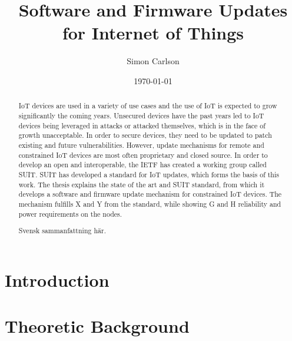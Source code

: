 \documentclass{kththesis}
\title{Software and Firmware Updates for Internet of Things}
\author{Simon Carlson}
\date{\today}
\begin{document}
\frontmatter

\titlepage

\begin{abstract}
IoT devices are used in a variety of use cases and the use of IoT is expected to grow
significantly the coming years. Unsecured devices have the past years led to IoT devices
being leveraged in attacks or attacked themselves, which is in the face of growth
unacceptable. In order to secure devices, they need to be updated to patch existing and
future vulnerabilities. However, update mechanisms for remote and constrained IoT devices
are most often proprietary and closed source. In order to develop an open and
interoperable, the IETF has created a working group called SUIT. SUIT has developed a
standard for IoT updates, which forms the basis of this work. The thesis explains the
state of the art and SUIT standard, from which it develops a software and firmware update
mechanism for constrained IoT devices. The mechanism fulfills X and Y from the standard,
while showing G and H reliability and power requirements on the nodes.

\end{abstract}


\begin{otherlanguage}{swedish}
    \begin{abstract}
        Svensk sammanfattning här.
    \end{abstract}
\end{otherlanguage}


\tableofcontents
\listoftables
\listoffigures
\lstlistoflistings
\printglossaries

\mainmatter


\chapter{Introduction}


\chapter{Theoretic Background}

\end{document}
